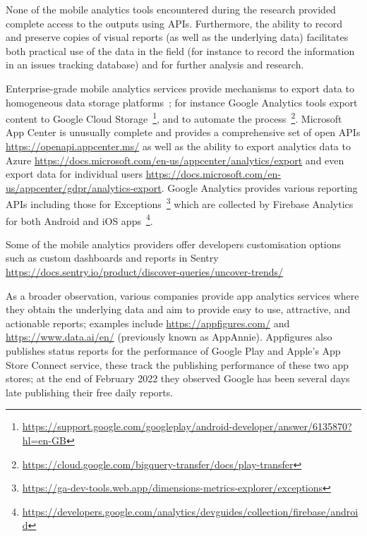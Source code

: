 None of the mobile analytics tools encountered during the research provided complete access to the outputs using APIs. Furthermore, the ability to record and preserve copies of visual reports (as well as the underlying data) facilitates both practical use of the data in the field (for instance to record the information in an issues tracking database) and for further analysis and research. 

Enterprise-grade mobile analytics services provide mechanisms to export data to homogeneous data storage platforms~\citep{androiddevelopers2015_integrate_play_data_into_your_workflow_with_data_exports}; for instance Google Analytics tools export content to Google Cloud Storage~\footnote{\url{https://support.google.com/googleplay/android-developer/answer/6135870?hl=en-GB}}, and to automate the process~\footnote{\url{https://cloud.google.com/bigquery-transfer/docs/play-transfer}}. Microsoft App Center is unusually complete and provides a comprehensive set of open APIs \url{https://openapi.appcenter.ms/} as well as the ability to export analytics data to Azure \url{https://docs.microsoft.com/en-us/appcenter/analytics/export} and even export data for individual users \url{https://docs.microsoft.com/en-us/appcenter/gdpr/analytics-export}. Google Analytics provides various reporting APIs including those for Exceptions~\footnote{\url{https://ga-dev-tools.web.app/dimensions-metrics-explorer/exceptions}} which are collected by Firebase Analytics for both Android and iOS apps~\footnote{\url{https://developers.google.com/analytics/devguides/collection/firebase/android}}. %

Some of the mobile analytics providers offer developers customisation options such as custom dashboards and reports in Sentry \url{https://docs.sentry.io/product/discover-queries/uncover-trends/}

As a broader observation, various companies provide app analytics services where they obtain the underlying data %
and aim to provide easy to use, attractive, and actionable reports; examples include \url{https://appfigures.com/} and \url{https://www.data.ai/en/} (previously known as AppAnnie). Appfigures also publishes status reports for the performance of Google Play and Apple's App Store Connect service, these track the publishing performance of these two app stores; at the end of February 2022 they observed Google has been several days late publishing their free daily reports. %

